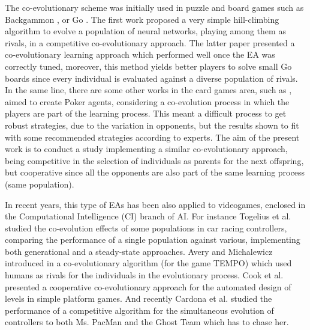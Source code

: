 \documentclass[conference]{IEEEtran}
\begin{document}
The co-evolutionary scheme was initially used in puzzle and board games such as Backgammon \cite{Pollack_Backgammon98}, or Go \cite{Runarsson_Go2005}.
The first work proposed a very simple hill-climbing algorithm to evolve a population of neural networks, playing among them as rivals, in a competitive co-evolutionary approach. The latter paper presented a co-evolutionary learning approach which performed well once the EA was correctly tuned, moreover, this method yields better players to solve small Go boards since every individual is evaluated against a diverse population of rivals.
In the same line, there are some other works in the card games area, such as \cite{Thompson_Poker2008}, aimed to create Poker agents, considering a co-evolution process in which the players are part of the learning process. This meant a difficult process to get robust strategies, due to the variation in opponents, but the results shown to fit with some recommended strategies according to experts.
The aim of the present work is to conduct a study implementing a similar co-evolutionary approach, being competitive in the selection of individuals as parents for the next offspring,
but cooperative since all the opponents are also part of the same learning process (same population).

In recent years, this type of EAs has been also applied to videogames, enclosed in the Computational Intelligence (CI) branch of AI.
For instance Togelius et al. \cite{Togelius_Cars2007} studied the co-evolution effects of some populations in car racing controllers, comparing the performance of a single population against various, implementing both generational and a steady-state approaches. Avery and Michalewicz introduced in \cite{Avery_Human2008} a co-evolutionary algorithm (for the game TEMPO) which used humans as rivals for the individuals in the evolutionary process.
Cook et al. \cite{Cook_Platforming2012} presented a cooperative co-evolutionary approach for the automated design of levels in simple platform games. And recently Cardona et al. \cite{Cardona_MSPacman2013} studied the performance of a competitive algorithm for the simultaneous evolution of controllers to both Ms. PacMan and the Ghost Team which has to chase her.
\end{document}
